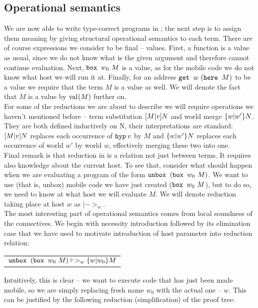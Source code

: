 \subsection{Operational semantics}

We are now able to write type-correct programs in \langL{}; the next step is to assign them meaning by giving structural operational semantics to each term. There are of course expressions we consider to be final -- values. First, a function is a value as usual, since we do not know what is the given argument and therefore cannot continue evaluation. Next, $\mbox{$\operatorname{\texttt{box}}_{}\ {w_0}\ {M}$}$ is a value, as for the mobile code we do not know what host we will run it at. Finally, for an address $\mbox{$\operatorname{\texttt{get}}_{}\ {w}\ {(}$}\mbox{$\operatorname{\texttt{here}}_{}\ {M}$})$ to be a value we require that the term $M$ is a value as well. We will denote the fact that $M$ is a value by $\mbox{$\mathrm{val}_{}{(M)}$}$ further on.\\

For some of the reductions we are about to describe we will require operations we haven't mentioned before -- term substitution $\mbox{$ [M | v] N$}$ and world merge $\mbox{$ \{w | w' \} N$}$. They are both defined inductively on N, their interpretations are standard: $\mbox{$ [M | v] N$}$ replaces each occurrence of $\mbox{$\operatorname{\texttt{hyp}}_{} {v}$}$ by $M$ and $\mbox{$ \{w | w' \} N$}$ replaces each occurrence of world $w'$ by world $w$, effectively merging these two into one.\\

Final remark is that reduction in \langL{} is a relation not just between terms. It requires also knowledge about the current host. To see that, consider what should happen when we are evaluating a program of the form $\mbox{$\operatorname{\texttt{unbox}}_{}\ {(}$}\mbox{$\operatorname{\texttt{box}}_{}\ {w_0}\ {M}$})$. We want to use (that is, unbox) mobile code we have just created ($\mbox{$\operatorname{\texttt{box}}_{}\ {w_0}\ {M}$}$), but to do so, we need to know at what host we will evaluate $M$. We will denote reduction taking place at host $w$ as $|->_w$.\\

The most interesting part of operational semantics comes from local soundness of the connectives. We begin with necessity introduction followed by its elimination case that we have used to motivate introduction of host parameter into reduction relation:
\begin{center}
\begin{tabular}{ c }
$\mbox{$\operatorname{\texttt{unbox}}_{}\ {(}$}\mbox{$\operatorname{\texttt{box}}_{}\ {w_0}\ {M}$}) |->_{w} \mbox{$ \{w | w_0 \} M$}$
\end{tabular}
\end{center}

Intuitively, this is clear -- we want to execute code that has just been made mobile, so we are simply replacing fresh name $w_0$ with the actual one -- $w$. This can be justified by the following reduction (simplification) of the proof tree:\\

